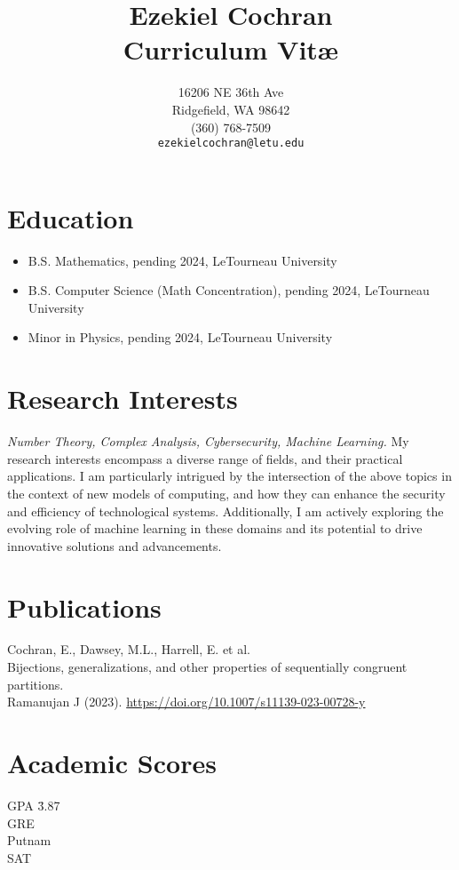 \documentclass[a4paper, 11pt]{article}
\title{Ezekiel Cochran\\Curriculum Vitæ}
\author{
    16206 NE 36th Ave \\
    Ridgefield, WA 98642 \\
    (360) 768-7509 \\
    \texttt{ezekielcochran@letu.edu} \\
}
\date{}
\begin{document}
    \maketitle
        
    \section*{Education}\label{sec:education}
    \begin{itemize}
        \item B.S. Mathematics, pending 2024, LeTourneau University
        \item B.S. Computer Science (Math Concentration), pending 2024, LeTourneau University
        \item Minor in Physics, pending 2024, LeTourneau University
    \end{itemize}

    \section*{Research Interests}\label{sec:research_interests}
    \textit{Number Theory, Complex Analysis, Cybersecurity, Machine Learning.}
    My research interests encompass a diverse range of fields, and their practical applications.
    I am particularly intrigued by the intersection of the above topics in the context of new models of computing,
    and how they can enhance the security and efficiency of technological systems.
    Additionally, I am actively exploring the evolving role of machine learning in these domains
    and its potential to drive innovative solutions and advancements.
    
    \section*{Publications}\label{sec:publications}
    Cochran, E., Dawsey, M.L., Harrell, E. et al. \\
    Bijections, generalizations, and other properties of sequentially congruent partitions. \\
    Ramanujan J (2023). \url{https://doi.org/10.1007/s11139-023-00728-y}
    
    \section*{Academic Scores}\label{sec:academic_scores}
    \begin{tabbing}
        GPA \qquad\= 3.87 \\
        GRE  \\
        Putnam  \\
        SAT  \\
    \end{tabbing}
\end{document}
